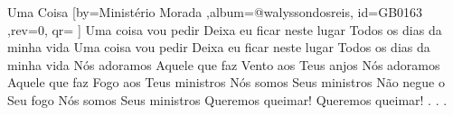 \beginsong
{Uma Coisa %
}[by={Ministério Morada %
},album={@walyssondosreis},
id={GB0163 %
},rev={0}, %
qr={ %
}]
\beginchorus
Uma coisa vou pedir
Deixa eu ficar neste lugar
Todos os dias da minha vida
Uma coisa vou pedir
Deixa eu ficar neste lugar
Todos os dias da minha vida
\endchorus
\beginverse
Nós adoramos Aquele que faz
Vento aos Teus anjos
Nós adoramos Aquele que faz
Fogo aos Teus ministros
\endverse
\beginverse
Nós somos Seus ministros
Não negue o Seu fogo
Nós somos Seus ministros
Queremos queimar! Queremos queimar!
\endverse
\beginverse*
.
.
.
\endverse
\begin{comment}
\lstset{basicstyle=\scriptsize\bf} %
\tab{Solo 1}
\begin{lstlisting}
E|-----------------------------------------------------|
B|-----------------------------------------------------|
G|-----------------------------------------------------|
D|-----------------------------------------------------|
A|-----------------------------------------------------|
E|-----------------------------------------------------|
\end{lstlisting}
\end{comment}
\vspace{2em} 
% 
% 
% 
% 
